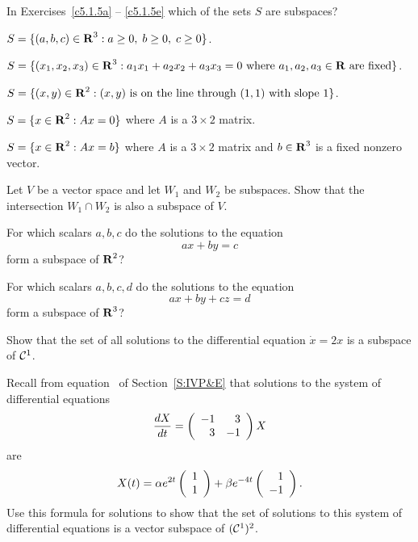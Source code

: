 \documentclass{ximera}
\begin{document}
\noindent In Exercises~\ref{c5.1.5a} -- \ref{c5.1.5e} which of the
sets $S$ are subspaces?
\begin{exercise} \label{c5.1.5a}
$S = \{(a,b,c)\in\mbox{$\bf{R}$}^3 : a\ge 0, \; b\ge 0,\; c\ge 0\}$.
\end{exercise}
\begin{exercise} \label{c5.1.5b}
$S = \{(x_1,x_2,x_3)\in\mbox{$\bf{R}$}^3 : a_1x_1+a_2x_2+a_3x_3=0
\mbox{ where } a_1,a_2,a_3\in\mbox{$\bf{R}$} \mbox{ are fixed}\}$.
\end{exercise}
\begin{exercise} \label{c5.1.5c}
$S = \{(x,y)\in\mbox{$\bf{R}$}^2: (x,y) \mbox{ is on the line through }
(1,1) \mbox{ with slope } 1\}$.
\end{exercise}
\begin{exercise} \label{c5.1.5d}
$S = \{x\in\mbox{$\bf{R}$}^2: Ax=0\}$ where $A$ is a $3\times 2$ matrix.
\end{exercise}
\begin{exercise} \label{c5.1.5e}
$S = \{x\in\mbox{$\bf{R}$}^2: Ax=b\}$ where $A$ is a $3\times 2$ matrix
	and $b\in\mbox{$\bf{R}$}^3$ is a fixed nonzero vector.
\end{exercise}

\begin{exercise} \label{c5.1.6}
Let $V$ be a vector space and let $W_1$ and $W_2$ be subspaces.
Show that the intersection $W_1\cap W_2$ is also a subspace of $V$.
\end{exercise}

\begin{exercise} \label{c5.1.7a}
For which scalars $a,b,c$ do the solutions to the equation
\[
ax+by = c
\]
form a subspace of $\mbox{$\bf{R}$}^2$?
\end{exercise}
\begin{exercise} \label{c5.1.7b}
For which scalars $a,b,c,d$ do the solutions to the equation
\[
ax+by+cz = d
\]
form a subspace of $\mbox{$\bf{R}$}^3$?
\end{exercise}

\begin{exercise} \label{c5.1.8}
Show that the set of all solutions to the differential equation
$\dot{x}=2x$ is a subspace of ${\cal C}^1$.
\end{exercise}

\begin{exercise} \label{c5.1.9}
Recall from equation~ of Section~\ref{S:IVP&E}
that solutions to the system of differential equations
\[
\frac{dX}{dt} = \left(\begin{array}{rr} -1 & 3\\ 3 &-1\end{array}\right) X
\]
are
\[
X(t) = \alpha e^{2t}\left(\begin{array}{r} 1 \\ 1\end{array}\right) + \beta e^{-4t}\left(\begin{array}{r} 1 \\ -1\end{array}\right).
\]
Use this formula for solutions to show that the set of solutions
to this system of differential equations is a vector subspace of
$({\cal C}^1)^2$.
\end{exercise}
\end{document}
